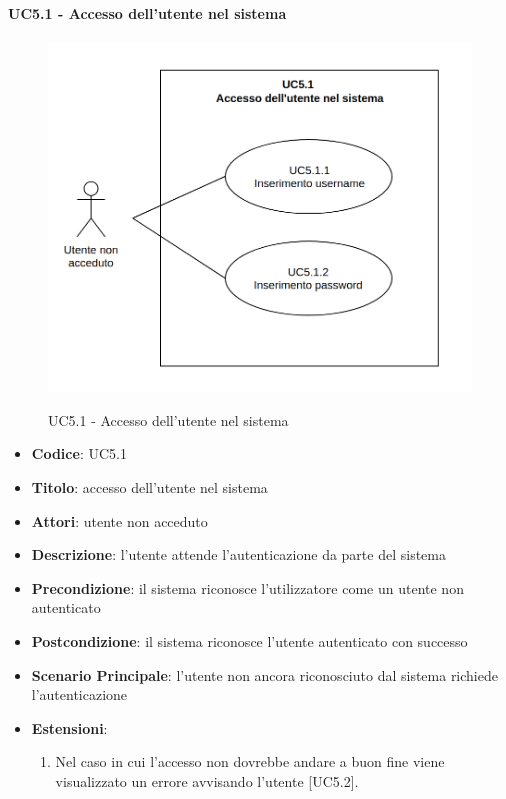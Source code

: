 	\paragraph{UC5.1 - Accesso dell'utente nel sistema}
		\begin{figure}[H]
			\centering
				\includegraphics[width=\columnwidth]{img/UC5_1.png}\\
			\caption{UC5.1 - Accesso dell'utente nel sistema}
		\end{figure}
		\begin{itemize}
			\item \textbf{Codice}: UC5.1
			\item \textbf{Titolo}: accesso dell'utente nel sistema
			\item \textbf{Attori}: utente non acceduto
			\item \textbf{Descrizione}: l'utente attende l'autenticazione da parte del sistema
			\item \textbf{Precondizione}: il sistema riconosce l'utilizzatore come un utente non autenticato
			\item \textbf{Postcondizione}: il sistema riconosce l'utente autenticato con successo
			\item \textbf{Scenario Principale}: l’utente non ancora riconosciuto dal sistema richiede l'autenticazione
			\item \textbf{Estensioni}:
			\begin{enumerate}
				\item Nel caso in cui l'accesso non dovrebbe andare a buon fine viene visualizzato un errore avvisando l'utente [UC5.2].
			\end{enumerate}
	\end{itemize}

